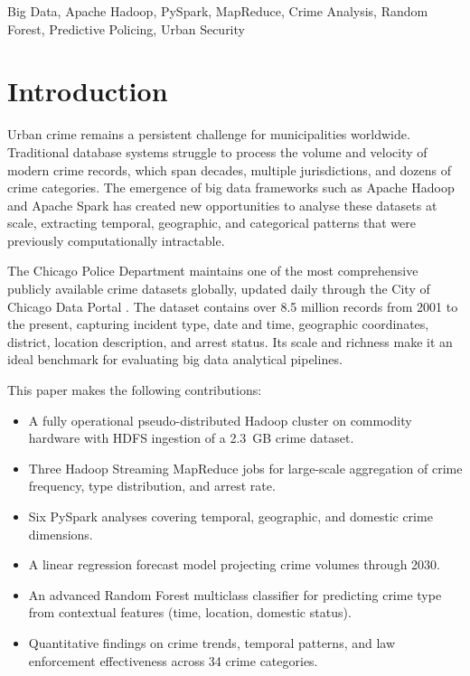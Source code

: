 \documentclass[conference]{IEEEtran}
\begin{document}
\begin{IEEEkeywords}
Big Data, Apache Hadoop, PySpark, MapReduce, Crime Analysis, Random Forest,
Predictive Policing, Urban Security
\end{IEEEkeywords}

\section{Introduction}

Urban crime remains a persistent challenge for municipalities worldwide. Traditional
database systems struggle to process the volume and velocity of modern crime records,
which span decades, multiple jurisdictions, and dozens of crime categories. The
emergence of big data frameworks such as Apache Hadoop and Apache Spark has created
new opportunities to analyse these datasets at scale, extracting temporal, geographic,
and categorical patterns that were previously computationally intractable.

The Chicago Police Department maintains one of the most comprehensive publicly
available crime datasets globally, updated daily through the City of Chicago Data
Portal \cite{chicagoportal}. The dataset contains over 8.5 million records from 2001
to the present, capturing incident type, date and time, geographic coordinates,
district, location description, and arrest status. Its scale and richness make it
an ideal benchmark for evaluating big data analytical pipelines.

This paper makes the following contributions:
\begin{itemize}
    \item A fully operational pseudo-distributed Hadoop cluster on commodity hardware
          with HDFS ingestion of a 2.3~GB crime dataset.
    \item Three Hadoop Streaming MapReduce jobs for large-scale aggregation of crime
          frequency, type distribution, and arrest rate.
    \item Six PySpark analyses covering temporal, geographic, and domestic crime
          dimensions.
    \item A linear regression forecast model projecting crime volumes through 2030.
    \item An advanced Random Forest multiclass classifier for predicting crime type
          from contextual features (time, location, domestic status).
    \item Quantitative findings on crime trends, temporal patterns, and law enforcement
          effectiveness across 34 crime categories.
\end{itemize}
\end{document}
